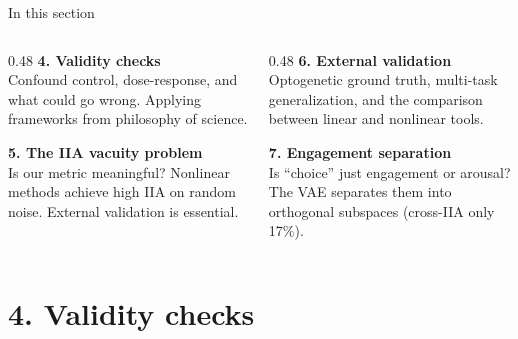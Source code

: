 \documentclass[aspectratio=169,11pt]{beamer}
\begin{document}
\begin{frame}{In this section}
\begin{columns}[T]
\begin{column}{0.48\textwidth}
\textbf{4. Validity checks}\\[0.2em]
{\small Confound control, dose-response, and what could go wrong. Applying frameworks from philosophy of science.}

\vspace{0.6em}
\textbf{5. The IIA vacuity problem}\\[0.2em]
{\small Is our metric meaningful? Nonlinear methods achieve high IIA on random noise. External validation is essential.}
\end{column}
\begin{column}{0.48\textwidth}
\textbf{6. External validation}\\[0.2em]
{\small Optogenetic ground truth, multi-task generalization, and the comparison between linear and nonlinear tools.}

\vspace{0.6em}
\textbf{7. Engagement separation}\\[0.2em]
{\small Is ``choice'' just engagement or arousal? The VAE separates them into orthogonal subspaces (cross-IIA only 17\%).}
\end{column}
\end{columns}
\end{frame}

\section{4. Validity checks}\hypertarget{sec:4}{}
\end{document}
